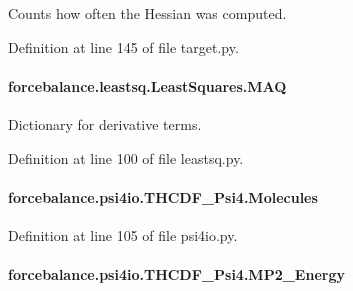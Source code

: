 Counts how often the Hessian was computed. 



Definition at line 145 of file target.\-py.

\hypertarget{classforcebalance_1_1leastsq_1_1LeastSquares_a7f08641f45285414b080f21ed278f31e}{
\paragraph[{M\-A\-Q}]{\setlength{\rightskip}{0pt plus 5cm}forcebalance.\-leastsq.\-Least\-Squares.\-M\-A\-Q\hspace{0.3cm}{\ttfamily [inherited]}}}\label{classforcebalance_1_1leastsq_1_1LeastSquares_a7f08641f45285414b080f21ed278f31e}


Dictionary for derivative terms. 



Definition at line 100 of file leastsq.\-py.

\hypertarget{classforcebalance_1_1psi4io_1_1THCDF__Psi4_a3f3231f0970970f6ce93c87673728fcd}{
\paragraph[{Molecules}]{\setlength{\rightskip}{0pt plus 5cm}forcebalance.\-psi4io.\-T\-H\-C\-D\-F\-\_\-\-Psi4.\-Molecules}}\label{classforcebalance_1_1psi4io_1_1THCDF__Psi4_a3f3231f0970970f6ce93c87673728fcd}


Definition at line 105 of file psi4io.\-py.

\hypertarget{classforcebalance_1_1psi4io_1_1THCDF__Psi4_a88f28862f46d19b0c36fc22967265715}{
\paragraph[{M\-P2\-\_\-\-Energy}]{\setlength{\rightskip}{0pt plus 5cm}forcebalance.\-psi4io.\-T\-H\-C\-D\-F\-\_\-\-Psi4.\-M\-P2\-\_\-\-Energy}}\label{classforcebalance_1_1psi4io_1_1THCDF__Psi4_a88f28862f46d19b0c36fc22967265715}


